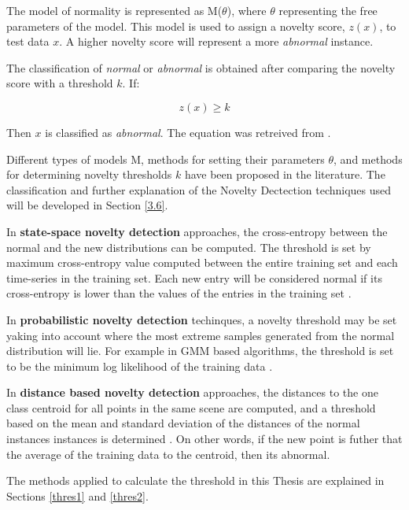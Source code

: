 The model of normality is represented as M(\( \theta  \)), where \( \theta  \)
representing the free parameters of the model. This model is used to assign a novelty score, $z(x)$, to test data $x$. A higher novelty score will represent a more \emph{abnormal} instance.

The classification of \emph{normal} or \emph{abnormal} is obtained after comparing the novelty score with a threshold $k$. If:

\begin{equation}
	z(x) \geq  k 
\end{equation}

Then $x$ is classified as \emph{abnormal}. The equation was retreived from \citeauthor{Pimentel2014} \cite{Pimentel2014}.

Different types of models M, methods for setting their parameters \( \theta  \), and methods for determining novelty thresholds $k$ have been proposed in the literature. The classification and further explanation of the Novelty Dectection techniques used will be developed in Section \ref{3.6}.

\label{thresholds}

In \textbf{state-space novelty detection} approaches, the cross-entropy between the normal and the new distributions can be computed. The threshold is set by maximum cross-entropy value computed between the entire training set and each time-series in the training set. Each new entry will be considered normal if its cross-entropy is lower than the values of the entries in the training set \cite{Pimentel2014}.

In \textbf{probabilistic novelty detection} techinques, a novelty threshold may be set yaking into account where the most extreme samples generated from the normal distribution will lie. For example in GMM based algorithms, the threshold is set to be the minimum log likelihood of the training data \cite{Pimentel2014}.

In \textbf{distance based novelty detection} approaches, the distances to the one class centroid for all points in the same scene are computed, and a threshold based on the mean and standard deviation of the distances of the normal instances instances is determined \cite{Pimentel2014}. On other words, if the new point is futher that the average of the training data to the centroid, then its abnormal. 

The methods applied to calculate the threshold in this Thesis are explained in Sections \ref{thres1} and \ref{thres2}.
 
